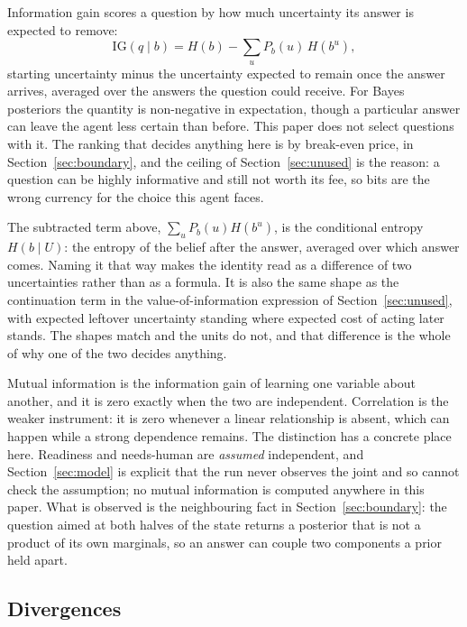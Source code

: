 \documentclass{article}
\begin{document}
Information gain scores a question by how much uncertainty its answer is expected to
remove:
\begin{equation}
\mathrm{IG}(q \mid b) = H(b) - \sum_u P_b(u)\, H(b^u) ,
\end{equation}
starting uncertainty minus the uncertainty expected to remain once the answer arrives,
averaged over the answers the question could receive. For Bayes posteriors the
quantity is non-negative in expectation, though a particular answer can leave the
agent less certain than before. This paper does not select questions with it. The
ranking that decides anything here is by break-even price, in
Section~\ref{sec:boundary}, and the ceiling of Section~\ref{sec:unused} is the reason:
a question can be highly informative and still not worth its fee, so bits are the
wrong currency for the choice this agent faces.

The subtracted term above, $\sum_u P_b(u) H(b^u)$, is the conditional entropy
$H(b \mid U)$: the entropy of the belief after the answer, averaged over which answer
comes. Naming it that way makes the identity read as a difference of two
uncertainties rather than as a formula. It is also the same shape as the continuation
term in the value-of-information expression of Section~\ref{sec:unused}, with expected
leftover uncertainty standing where expected cost of acting later stands. The shapes
match and the units do not, and that difference is the whole of why one of the two
decides anything.

Mutual information is the information gain of learning one variable about another, and
it is zero exactly when the two are independent. Correlation is the weaker instrument:
it is zero whenever a linear relationship is absent, which can happen while a strong
dependence remains. The distinction has a concrete place here. Readiness and
needs-human are \emph{assumed} independent, and Section~\ref{sec:model} is explicit
that the run never observes the joint and so cannot check the assumption; no mutual
information is computed anywhere in this paper. What is observed is the neighbouring
fact in Section~\ref{sec:boundary}: the question aimed at both halves of the state
returns a posterior that is not a product of its own marginals, so an answer can couple
two components a prior held apart.

\subsection{Divergences}
\end{document}
